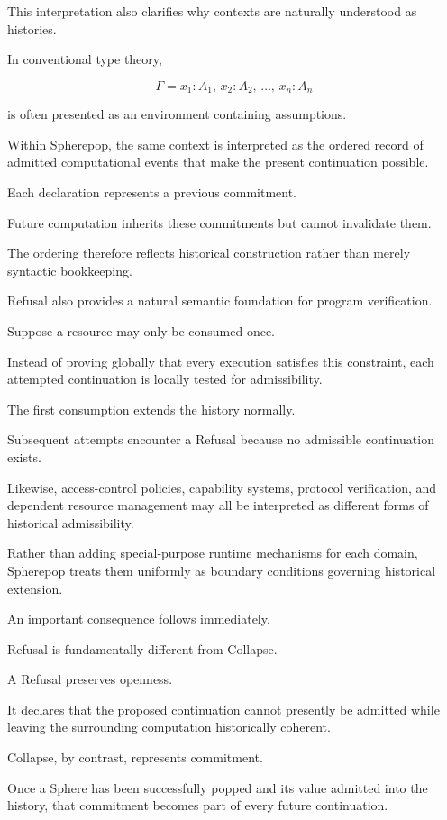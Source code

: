 \documentclass[12pt,oneside]{article}
\theoremstyle{definition}
\theoremstyle{remark}
\begin{document}
This interpretation also clarifies why contexts are naturally understood as
histories.

In conventional type theory,

\[
\Gamma
=
x_1:A_1,\,
x_2:A_2,\,
\ldots,\,
x_n:A_n
\]

is often presented as an environment containing assumptions.

Within Spherepop, the same context is interpreted as the ordered record of
admitted computational events that make the present continuation possible.

Each declaration represents a previous commitment.

Future computation inherits these commitments but cannot invalidate them.

The ordering therefore reflects historical construction rather than merely
syntactic bookkeeping.

Refusal also provides a natural semantic foundation for program verification.

Suppose a resource may only be consumed once.

Instead of proving globally that every execution satisfies this constraint,
each attempted continuation is locally tested for admissibility.

The first consumption extends the history normally.

Subsequent attempts encounter a Refusal because no admissible continuation
exists.

Likewise, access-control policies, capability systems, protocol verification,
and dependent resource management may all be interpreted as different forms of
historical admissibility.

Rather than adding special-purpose runtime mechanisms for each domain,
Spherepop treats them uniformly as boundary conditions governing historical
extension.

An important consequence follows immediately.

Refusal is fundamentally different from Collapse.

A Refusal preserves openness.

It declares that the proposed continuation cannot presently be admitted while
leaving the surrounding computation historically coherent.

Collapse, by contrast, represents commitment.

Once a Sphere has been successfully popped and its value admitted into the
history, that commitment becomes part of every future continuation.
\end{document}
